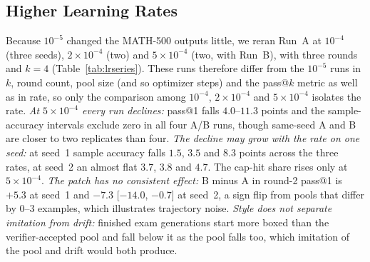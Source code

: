 \documentclass[runningheads]{llncs}
\begin{document}
\subsection{Higher Learning Rates}
\label{sec:lrcheck}

Because $10^{-5}$ changed the MATH-500 outputs little, we reran Run~A at
$10^{-4}$ (three seeds), $2\times10^{-4}$ (two) and $5\times10^{-4}$ (two,
with Run~B), with three rounds and $k=4$ (Table~\ref{tab:lrseries}). These
runs therefore differ from the $10^{-5}$ runs in $k$, round count, pool size
(and so optimizer steps) and the pass@$k$ metric as well as in rate, so only
the comparison among $10^{-4}$, $2\times10^{-4}$ and $5\times10^{-4}$ isolates
the rate.
\emph{At $5\times10^{-4}$ every run declines:} pass@1 falls $4.0$--$11.3$
points and the sample-accuracy intervals exclude zero in all four A/B runs,
though same-seed A and B are closer to two replicates than four.
\emph{The decline may grow with the rate on one seed:} at seed~1 sample accuracy
falls $1.5$, $3.5$ and $8.3$ points across the three rates, at seed~2 an almost
flat $3.7$, $3.8$ and $4.7$. The cap-hit share rises only at $5\times10^{-4}$.
\emph{The patch has no consistent effect:} B minus A in round-2 pass@1 is
$+5.3$ at seed~1 and $-7.3$ [$-14.0$, $-0.7$] at seed~2, a sign flip from pools
that differ by $0$--$3$ examples, which illustrates trajectory noise.
\emph{Style does not separate imitation from drift:} finished exam generations
start more boxed than the verifier-accepted pool and fall below it as the pool
falls too, which imitation of the pool and drift would both produce.
\end{document}
